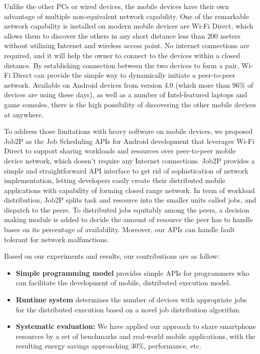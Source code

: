 \documentclass[conference]{IEEEtran}
\begin{document}
Unlike the other PCs or wired devices, the mobile devices have their own advantage of multiple non-equivalent network capability. One of the remarkable network capability is installed on modern mobile devices are Wi-Fi Direct, which allows them to discover the others in any short distance less than 200 meters without utilizing Internet and wireless access point. No internet connections are required, and it will help the owner to connect to the devices within a closed distance. By establishing connection between the two devices to form a pair, Wi-Fi Direct can provide the simple way to dynamically initiate a peer-to-peer network. Available on Android devices from version 4.0 (which more than 96\% of devices are using these days), as well as a number of Intel-featured laptops and game consoles, there is the high possibility of discovering the other mobile devices at anywhere.

To address those limitations with heavy software on mobile devices, we proposed Job2P as the Job Scheduling APIs for Android development that leverages Wi-Fi Direct to support sharing workloads and resources over peer-to-peer mobile device network, which doesn't require any Internet connections. Job2P provides a simple and straightforward API interface to get rid of sophistication of network implementation, letting developers easily create their distributed mobile applications with capability of forming closed range network. In term of workload distribution, Job2P splits task and resource into the smaller units called jobs, and dispatch to the peers. To distributed jobs equitably among the peers, a decision making module is added to decide the amount of resource the peer has to handle bases on its percentage of availability. Moreover, our APIs can handle fault tolerant for network malfunctions.

Based on our experiments and results, our contributions are as follow:
\begin{itemize}
	\item \textbf{Simple programming model} provides simple APIs for programmers who can facilitate the development of mobile, distributed execution model.
	\item \textbf{Runtime system} determines the number of devices with appropriate jobs for the distributed execution based on a novel job distribution algorithm.  
	\item \textbf{Systematic evaluation:} 
	 We have applied our approach to share smartphone resources by a set of benchmarks and real-world mobile applications, with the resulting energy savings approaching 30\%, performance, etc.

\end{itemize}
 
\end{document}
